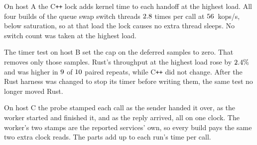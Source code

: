 \documentclass[english,oneside,a4paper,censored,csm,software-track-2020]{HYthesisML}
\begin{document}
\begin{appendices}
On host A the C\texttt{++} lock adds kernel time to each handoff at the highest load. All
four builds of the queue swap switch threads $2.8$ times per call at
$56$~kops/s, below saturation, so at that load the lock causes no extra thread
sleeps. No switch count was taken at the highest load.

The timer test on host B set the cap on the deferred samples to zero. That
removes only those samples. Rust's throughput at the highest
load rose by $2.4\%$ and was higher in $9$
of $10$ paired repeats, while C\texttt{++} did not change. After
the Rust harness was changed to stop its timer before writing them, the same
test no longer moved Rust.

On host C the probe stamped each call as the sender handed it over, as the
worker started and finished it, and as the reply arrived, all on one clock.
The worker's two stamps are the reported services' own, so every build pays
the same two extra clock reads. The parts add up to each run's time per
call.

\end{appendices}

\clearpage
\end{document}
